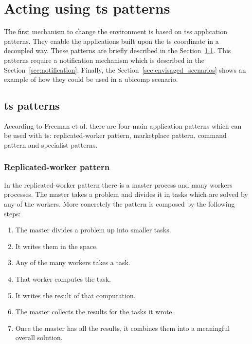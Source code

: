 
\section{Acting using \ac{ts} patterns}

The first mechanism to change the environment is based on \acp{ts} application patterns.
They enable the applications built upon the \ac{ts} coordinate in a decoupled way.
These patterns are briefly described in the Section~\ref{sec:ts_patterns}.
This patterns require a notification mechanism which is described in the Section~\ref{sec:notification}.
Finally, the Section~\ref{sec:envisaged_scenarios} shows an example of how they could be used in a \ac{ubicomp} scenario.


\subsection{\ac{ts} patterns}
\label{sec:ts_patterns}

According to Freeman et al. \citep{freeman_javaspaces_1999} there are four main application patterns which can be used with \ac{ts}:
replicated-worker pattern, marketplace pattern, command pattern and specialist patterns.


\subsubsection{Replicated-worker pattern}

In the replicated-worker pattern there is a master process and many workers processes.
The master takes a problem and divides it in tasks which are solved by any of the workers.
More concretely the pattern is composed by the following steps:

\begin{enumerate}
  \item The master divides a problem up into smaller tasks.
  \item It writes them in the space.
  \item Any of the many workers takes a task.
  \item That worker computes the task.
  \item It writes the result of that computation.
  \item The master collects the results for the tasks it wrote.
  \item Once the master has all the results, it combines them into a meaningful overall solution.
\end{enumerate}

